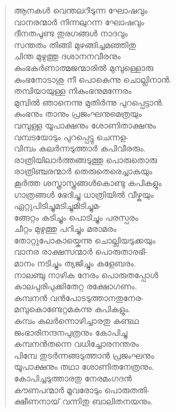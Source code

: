 \begin{verse}
ആനകള്‍ വെന്തലറീടുന്ന ഘോഷവും\\
വാനരന്മാര്‍ നിന്നലുറന്ന ഘോഷവും\\
ദീനതപൂണ്ട തുരഗങ്ങള്‍ നാദവും\\
സന്തതം തിങ്ങി മുഴങ്ങിച്ചമഞ്ഞിതു\\
ചിന്ത മുഴുത്തു ദശാനനവീരനും\\
കുംഭകര്‍ണാത്മജന്മാരില്‍ മുമ്പുള്ളൊരു\\
കുംഭനോടാശു നീ പൊകെന്നു ചൊല്ലിനാന്‍.\\
തമ്പിയായുള്ള നികുംഭനുമന്നേരം\\
മുമ്പില്‍ ഞാനെന്നു മുതിര്‍ന്നു പുറപ്പെട്ടാന്‍.\\
കുംഭനും താനും പ്രജംഘനുമെത്രയും\\
വമ്പുള്ള യൂപാക്ഷനും ശോണിതാക്ഷനും\\
വമ്പടയോടും പുറപ്പെട്ടു ചെന്നള-\\
വിമ്പം കലര്‍ന്നടുത്താര്‍ കപിവീരരും.\\
രാത്രിയിലാര്‍ത്തങ്ങടുത്തു പൊരുതൊരു\\
രാത്രിഞ്ചരന്മാര്‍ തെരുതെരെച്ചാകയും\\
കൂര്‍ത്ത ശസ്ത്രാസ്ത്രങ്ങള്‍കൊണ്ടു കപികളും\\
ഗാത്രങ്ങള്‍ ഭേദിച്ചു ധാത്രിയില്‍ വീഴ്കയും\\
ഏറ്റുപിടിച്ചുമടിച്ചുമിടിച്ചുമ-\\
ങ്ങേറ്റം കടിച്ചും പൊടിച്ചും പരസ്പരം\\
ചീറ്റം മുഴുത്തു പറിച്ചും മരാമരം\\
തോറ്റുപോകായ്കെന്നു ചൊല്ലിയടുക്കയും\\
വാനര രാക്ഷസന്മാര്‍ പൊരുതാരഭി-\\
മാനം നടിച്ചും ത്യജിച്ചും കളേബരം.\\
നാലഞ്ചു നാഴിക നേരം പൊരുതപ്പോള്‍\\
കാലപുരിപുക്കിതേറ്റ രക്ഷോഗണം.\\
കമ്പനന്‍ വന്‍പോടടുത്താനതുനേര-\\
മമ്പുകൊണ്ടേറ്റമകന്നു കപികളും.\\
കമ്പം കലര്‍ന്നൊഴിച്ചാരതു കണ്ടഥ\\
ജംഭാരിനന്ദനപുത്രനും കോപിച്ചു\\
കമ്പനന്‍തന്നെ വധിച്ചോരനന്തരം\\
പിമ്പേ തുടര്‍ന്നങ്ങടുത്താന്‍ പ്രജംഘനും\\
യൂപാക്ഷനും തഥാ ശോണിതനേത്രനും.\\
കോപിച്ചടുത്താരതു നേരമംഗദന്‍\\
കൗണപന്മാര്‍ മൂവരോടും പൊരുതതി-\\
ക്ഷീണനായ് വന്നിതു ബാലിതനയനും.\\

\end{verse}
